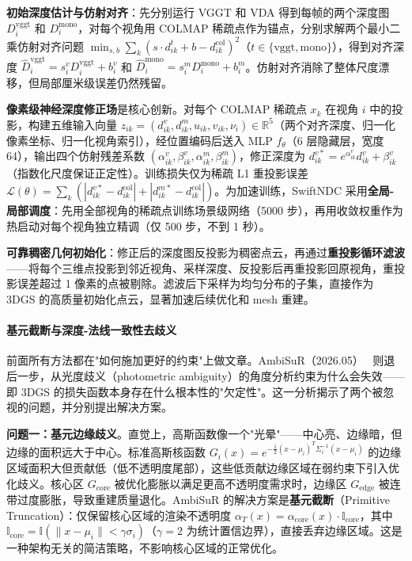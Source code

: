\textbf{初始深度估计与仿射对齐}：先分别运行 VGGT 和 VDA 得到每帧的两个深度图 $D_i^{\text{vggt}}$ 和 $D_i^{\text{mono}}$，对每个视角用 COLMAP 稀疏点作为锚点，分别求解两个最小二乘仿射对齐问题 $\min_{s,b} \sum_k (s \cdot d_{ik}^t + b - d_{ik}^{\text{col}})^2$（$t \in \{\text{vggt}, \text{mono}\}$），得到对齐深度 $\hat{D}_i^{\text{vggt}} = s_i^v D_i^{\text{vggt}} + b_i^v$ 和 $\hat{D}_i^{\text{mono}} = s_i^m D_i^{\text{mono}} + b_i^m$。仿射对齐消除了整体尺度漂移，但局部厘米级误差仍然残留。

\textbf{像素级神经深度修正场}是核心创新。对每个 COLMAP 稀疏点 $x_k$ 在视角 $i$ 中的投影，构建五维输入向量 $z_{ik} = (d_{ik}^v, d_{ik}^m, u_{ik}, v_{ik}, \nu_i) \in \mathbb{R}^5$（两个对齐深度、归一化像素坐标、归一化视角索引），经位置编码后送入 MLP $f_\theta$（6 层隐藏层，宽度 64），输出四个仿射残差系数 $(\alpha_{ik}^v, \beta_{ik}^v, \alpha_{ik}^m, \beta_{ik}^m)$，修正深度为 $d_{ik}^{v*} = e^{\alpha_{ik}^v} d_{ik}^v + \beta_{ik}^v$（指数化尺度保证正定性）。训练损失仅为稀疏 L1 重投影误差 $\mathcal{L}(\theta) = \sum_k (|d_{ik}^{v*} - d_{ik}^{\text{col}}| + |d_{ik}^{m*} - d_{ik}^{\text{col}}|)$。为加速训练，SwiftNDC 采用\textbf{全局-局部调度}：先用全部视角的稀疏点训练场景级网络（5000 步），再用收敛权重作为热启动对每个视角独立精调（仅 500 步，不到 1 秒）。

\textbf{可靠稠密几何初始化}：修正后的深度图反投影为稠密点云，再通过\textbf{重投影循环滤波}——将每个三维点投影到邻近视角、采样深度、反投影后再重投影回原视角，重投影误差超过 1 像素的点被剔除。滤波后下采样为均匀分布的子集，直接作为 3DGS 的高质量初始化点云，显著加速后续优化和 mesh 重建。

\paragraph{基元截断与深度-法线一致性去歧义}

前面所有方法都在"如何施加更好的约束"上做文章。AmbiSuR（2026.05）~\cite{2605_12494} 则退后一步，从光度歧义（photometric ambiguity）的角度分析约束为什么会失效——即 3DGS 的损失函数本身存在什么根本性的"欠定性"。这一分析揭示了两个被忽视的问题，并分别提出解决方案。

\textbf{问题一：基元边缘歧义}。直觉上，高斯函数像一个"光晕"——中心亮、边缘暗，但边缘的面积远大于中心。标准高斯核函数 $G_i(x) = e^{-\frac{1}{2}(x-\mu_i)^T \Sigma_i^{-1}(x-\mu_i)}$ 的边缘区域面积大但贡献低（低不透明度尾部），这些低贡献边缘区域在弱约束下引入优化歧义。核心区 $G_{\text{core}}$ 被优化膨胀以满足更高不透明度需求时，边缘区 $G_{\text{edge}}$ 被连带过度膨胀，导致重建质量退化。AmbiSuR 的解决方案是\textbf{基元截断}（Primitive Truncation）：仅保留核心区域的渲染不透明度 $\alpha_T(x) = \alpha_{\text{core}}(x) \cdot \mathbb{I}_{\text{core}}$，其中 $\mathbb{I}_{\text{core}} = \mathbb{I}(\|x - \mu_i\| < \gamma \sigma_i)$（$\gamma = 2$ 为统计置信边界），直接丢弃边缘区域。这是一种架构无关的简洁策略，不影响核心区域的正常优化。

